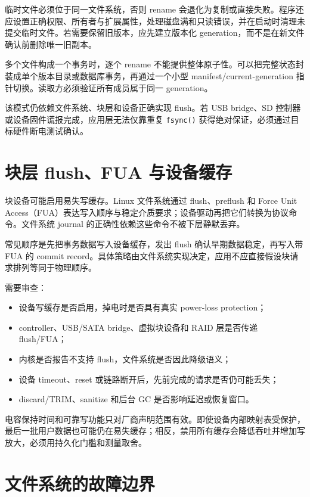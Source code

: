 临时文件必须位于同一文件系统，否则 rename 会退化为复制或直接失败。程序还应设置正确权限、所有者与扩展属性，处理磁盘满和只读错误，并在启动时清理未提交临时文件。若需要保留旧版本，应先建立版本化 generation，而不是在新文件确认前删除唯一旧副本。

多个文件构成一个事务时，逐个 rename 不能提供整体原子性。可以把完整状态封装成单个版本目录或数据库事务，再通过一个小型 manifest/current-generation 指针切换。读取方必须验证所有成员属于同一 generation。

该模式仍依赖文件系统、块层和设备正确实现 flush。若 USB bridge、SD 控制器或设备固件谎报完成，应用层无法仅靠重复 \texttt{fsync()} 获得绝对保证，必须通过目标硬件断电测试确认。

\section{块层 flush、FUA 与设备缓存}

块设备可能启用易失写缓存。Linux 文件系统通过 flush、preflush 和 Force Unit Access（FUA）表达写入顺序与稳定介质要求；设备驱动再把它们转换为协议命令\cite{linux-block-writeback-cache}。文件系统 journal 的正确性依赖这些命令不被下层静默丢弃。

常见顺序是先把事务数据写入设备缓存，发出 flush 确认早期数据稳定，再写入带 FUA 的 commit record。具体策略由文件系统实现决定，应用不应直接假设块请求排列等同于物理顺序。

需要审查：

\begin{itemize}
  \item 设备写缓存是否启用，掉电时是否具有真实 power-loss protection；
  \item controller、USB/SATA bridge、虚拟块设备和 RAID 层是否传递 flush/FUA；
  \item 内核是否报告不支持 flush，文件系统是否因此降级语义；
  \item 设备 timeout、reset 或链路断开后，先前完成的请求是否仍可能丢失；
  \item discard/TRIM、sanitize 和后台 GC 是否影响延迟或恢复窗口。
\end{itemize}

电容保持时间和可靠写功能只对厂商声明范围有效。即使设备内部映射表受保护，最后一批用户数据也可能仍在易失缓存；相反，禁用所有缓存会降低吞吐并增加写放大，必须用持久化门槛和测量取舍。

\section{文件系统的故障边界}

